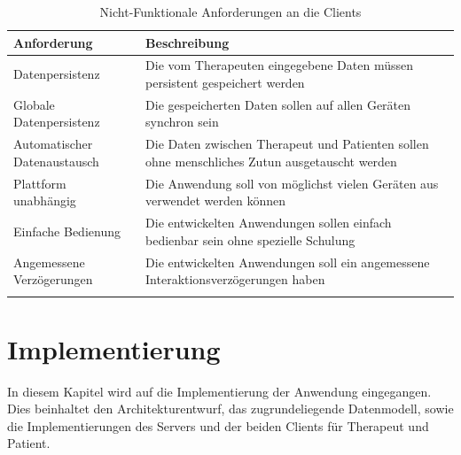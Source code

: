 \begin{table} [htbp]
	\begin{center}
		\begin{tabular}{p{4cm} p{10cm}}
		\rowcolor{black!20} \textbf{Anforderung} & \textbf{Beschreibung} \\
		\hline \toprule
		Datenpersistenz & Die vom Therapeuten eingegebene Daten müssen persistent gespeichert werden \\ \hline \addlinespace
		Globale Datenpersistenz & Die gespeicherten Daten sollen auf allen Geräten synchron sein \\ \hline \addlinespace
		Automatischer Datenaustausch & Die Daten zwischen Therapeut und Patienten sollen ohne menschliches Zutun ausgetauscht werden \\ \hline \addlinespace
		Plattform unabhängig & Die Anwendung soll von möglichst vielen Geräten aus verwendet werden können \\  \hline \addlinespace
		Einfache Bedienung & Die entwickelten Anwendungen sollen einfach bedienbar sein ohne spezielle Schulung \\  \hline \addlinespace
		Angemessene Verzögerungen & Die entwickelten Anwendungen soll ein angemessene Interaktionsverzögerungen haben \\  \hline \addlinespace
		\end{tabular}
	\end{center}
	\label{NichtFunktionaleAnforderungenTherapeutClient}
	\caption[Nicht-Funktionale Anforderungen an die Clients]{Nicht-Funktionale Anforderungen an die Clients}
\end{table}



\chapter{Implementierung}\label{Implementierung} 
In diesem Kapitel wird auf die Implementierung der Anwendung eingegangen. Dies beinhaltet den Architekturentwurf, das zugrundeliegende Datenmodell, sowie die Implementierungen des Servers und der beiden Clients für Therapeut und Patient.

